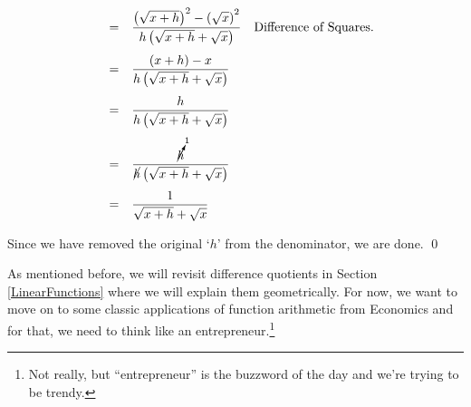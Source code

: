 \begin{ex}
\begin{enumerate}
\[\begin{array}{rcll}
												 & = &  \dfrac{\left(\sqrt{x+h}\right)^2 - \left(\sqrt{x}\right)^2}{h\left(\sqrt{x+h} + \sqrt{x}\right)} & \text{Difference of Squares.}\\ [15pt]
												
												& = &  \dfrac{(x+h) - x}{h\left(\sqrt{x+h} + \sqrt{x}\right)} & \\ [15pt]
												
												 & = &  \dfrac{h}{h\left(\sqrt{x+h} + \sqrt{x}\right)} & \\ [15pt]
												 
												 												 & = &  \dfrac{\cancelto{1}{h}}{\cancel{h}\left(\sqrt{x+h} + \sqrt{x}\right)} & \\ [15pt]
										
										
												 & = &  \dfrac{1}{\sqrt{x+h} + \sqrt{x}} & \\ 
												\end{array}\]	


Since we have removed the original `$h$' from the denominator, we are done.  \qed

\end{enumerate}

\end{ex}

\label{diffquotgeompromise}

As mentioned before, we will revisit difference quotients in Section \ref{LinearFunctions} where we will explain them geometrically.  For now, we want to move on to some classic applications of function arithmetic from Economics and for that, we need to think like an entrepreneur.\footnote{Not really, but ``entrepreneur'' is the buzzword of the day and we're trying to be trendy.}

\medskip


